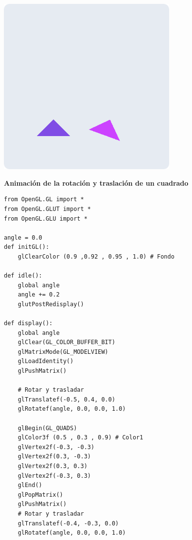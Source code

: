 \documentclass[a4paper]{article}
\begin{document}
\begin{center}
\includegraphics[width=9cm]{./src/transformacion.png}
\end{center}
\newpage
\Large{\textbf{Animación de la rotación y traslación de un cuadrado}}\\[-0.4cm]
\begin{center}
\begin{mycodebox}
\begin{lstlisting}
from OpenGL.GL import *
from OpenGL.GLUT import *
from OpenGL.GLU import *

angle = 0.0 
def initGL():
    glClearColor (0.9 ,0.92 , 0.95 , 1.0) # Fondo

def idle():
    global angle
    angle += 0.2
    glutPostRedisplay()

def display():
    global angle
    glClear(GL_COLOR_BUFFER_BIT)
    glMatrixMode(GL_MODELVIEW)  
    glLoadIdentity()  
    glPushMatrix() 

    # Rotar y trasladar
    glTranslatef(-0.5, 0.4, 0.0)  
    glRotatef(angle, 0.0, 0.0, 1.0)

    glBegin(GL_QUADS)
    glColor3f (0.5 , 0.3 , 0.9) # Color1
    glVertex2f(-0.3, -0.3)
    glVertex2f(0.3, -0.3)
    glVertex2f(0.3, 0.3)
    glVertex2f(-0.3, 0.3)
    glEnd()
    glPopMatrix()
    glPushMatrix() 
    # Rotar y trasladar
    glTranslatef(-0.4, -0.3, 0.0) 
    glRotatef(angle, 0.0, 0.0, 1.0) 

\end{lstlisting}
\end{mycodebox}
\end{center}
\newpage
\end{document}
